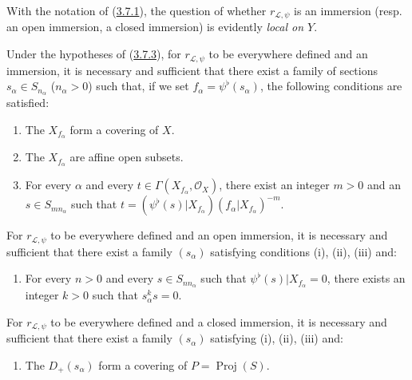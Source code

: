 \begin{env}[3.8.1]
\label{II.3.8.1}
With the notation of (\hyperref[II.3.7.1]{3.7.1}), the question of whether
$r_{\mathcal{L},\psi}$ is an immersion (resp. an open immersion, a
closed immersion) is evidently \emph{local on $Y$}.
\end{env}

\begin{proposition}[3.8.2]
\label{II.3.8.2}
Under the hypotheses of (\hyperref[II.3.7.3]{3.7.3}), for
$r_{\mathcal{L},\psi}$ to be everywhere defined and an immersion, it is
necessary and sufficient that there exist a family of sections
$s_\alpha\in S_{n_\alpha}$ ($n_\alpha>0$) such that, if we set
$f_\alpha=\psi^\flat(s_\alpha)$, the following conditions are satisfied:
\begin{enumerate}
  \item[(i)] The $X_{f_\alpha}$ form a covering of $X$.
  \item[(ii)] The $X_{f_\alpha}$ are affine open subsets.
  \item[(iii)] For every $\alpha$ and every
    $t\in\Gamma(X_{f_\alpha},\mathcal{O}_X)$, there exist an integer $m>0$ and
    an $s\in S_{mn_\alpha}$ such that
    $t=(\psi^\flat(s)|X_{f_\alpha})(f_\alpha|X_{f_\alpha})^{-m}$.
\end{enumerate}

For $r_{\mathcal{L},\psi}$ to be everywhere defined and an open
immersion, it is necessary and sufficient that there exist a family
$(s_\alpha)$ satisfying conditions (i), (ii), (iii) and:
\begin{enumerate}
  \item[(iv)] For every $n>0$ and every $s\in S_{nn_\alpha}$ such that
    $\psi^\flat(s)|X_{f_\alpha}=0$, there exists an integer $k>0$ such that
    $s_\alpha^ks=0$.
\end{enumerate}

For $r_{\mathcal{L},\psi}$ to be everywhere defined and a closed
immersion, it is necessary and sufficient that there exist a family
$(s_\alpha)$ satisfying (i), (ii), (iii) and:
\begin{enumerate}
  \item[(v)] The $D_+(s_\alpha)$ form a covering of
    $P=\operatorname{Proj}(S)$.
\end{enumerate}
\end{proposition}

